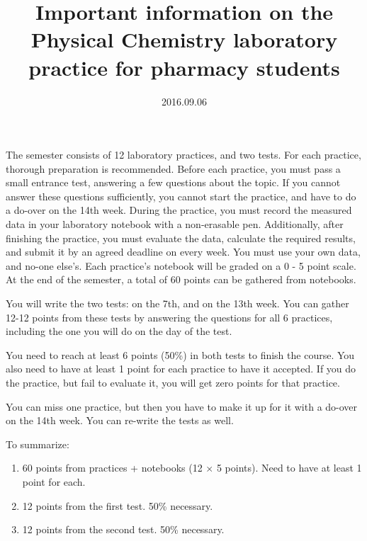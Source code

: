 \documentclass{article}
\begin{document}
\title{Important information on the Physical Chemistry laboratory practice for pharmacy students}
\date{2016.09.06}
\maketitle

The semester consists of 12 laboratory practices, and two tests. For each practice, thorough preparation is recommended. Before each practice, you must pass a small entrance test, answering a few questions about the topic. If you cannot answer these questions sufficiently, you cannot start the practice, and have to do a do-over on the 14th week. During the practice, you must record the measured data in your laboratory notebook with a non-erasable pen. Additionally, after finishing the practice, you must evaluate the data, calculate the required results, and submit it by an agreed deadline on every week. You must use your own data, and no-one else's. Each practice's notebook will be graded on a 0 - 5 point scale. At the end of the semester, a total of 60 points can be gathered from notebooks. 

You will write the two tests: on the 7th, and on the 13th week. You can gather 12-12 points from these tests by answering the questions for all 6 practices, including the one you will do on the day of the test.

You need to reach at least 6 points (50\%) in both tests to finish the course. You also need to have at least 1 point for each practice to have it accepted. If you do the practice, but fail to evaluate it, you will get zero points for that practice.

You can miss one practice, but then you have to make it up for it with a do-over on the 14th week. You can re-write the tests as well.

To summarize: 

\begin{enumerate}
\item 60 points from practices + notebooks (12 $\times$ 5 points). Need to have at least 1 point for each.
\item 12 points from the first test. 50\% necessary.
\item 12 points from the second test. 50\% necessary. 
\end{enumerate}
\end{document}
